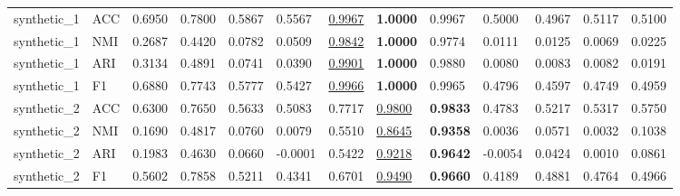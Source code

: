 \begin{table}
\begin{tabular}{lllllllllllll}
synthetic_1 & ACC & 0.6950 & 0.7800 & 0.5867 & 0.5567 & \underline{0.9967} & \textbf{1.0000} & 0.9967 & 0.5000 & 0.4967 & 0.5117 & 0.5100 \\
synthetic_1 & NMI & 0.2687 & 0.4420 & 0.0782 & 0.0509 & \underline{0.9842} & \textbf{1.0000} & 0.9774 & 0.0111 & 0.0125 & 0.0069 & 0.0225 \\
synthetic_1 & ARI & 0.3134 & 0.4891 & 0.0741 & 0.0390 & \underline{0.9901} & \textbf{1.0000} & 0.9880 & 0.0080 & 0.0083 & 0.0082 & 0.0191 \\
synthetic_1 & F1 & 0.6880 & 0.7743 & 0.5777 & 0.5427 & \underline{0.9966} & \textbf{1.0000} & 0.9965 & 0.4796 & 0.4597 & 0.4749 & 0.4959 \\
synthetic_2 & ACC & 0.6300 & 0.7650 & 0.5633 & 0.5083 & 0.7717 & \underline{0.9800} & \textbf{0.9833} & 0.4783 & 0.5217 & 0.5317 & 0.5750 \\
synthetic_2 & NMI & 0.1690 & 0.4817 & 0.0760 & 0.0079 & 0.5510 & \underline{0.8645} & \textbf{0.9358} & 0.0036 & 0.0571 & 0.0032 & 0.1038 \\
synthetic_2 & ARI & 0.1983 & 0.4630 & 0.0660 & -0.0001 & 0.5422 & \underline{0.9218} & \textbf{0.9642} & -0.0054 & 0.0424 & 0.0010 & 0.0861 \\
synthetic_2 & F1 & 0.5602 & 0.7858 & 0.5211 & 0.4341 & 0.6701 & \underline{0.9490} & \textbf{0.9660} & 0.4189 & 0.4881 & 0.4764 & 0.4966 \\
\bottomrule
\end{tabular}
\end{table}
